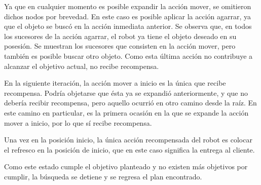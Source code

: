 \documentclass[11pt]{article}
\begin{document}
Ya que en cualquier momento es posible expandir la acción mover, se omitieron dichos nodos por brevedad. En este caso es posible aplicar la acción agarrar, ya que el objeto se buscó en la acción inmediata anterior. Se observa que, en todos los sucesores de la acción agarrar, el robot ya tiene el objeto deseado en su posesión. Se muestran los sucesores que consisten en la acción mover, pero también es posible buscar otro objeto. Como esta última acción no contribuye a alcanzar el objetivo actual, no recibe recompensa.

En la siguiente iteración, la acción mover a inicio es la única que recibe recompensa. Podría objetarse que ésta ya se expandió anteriormente, y que no debería recibir recompensa, pero aquello ocurrió en otro camino desde la raíz. En este camino en particular, es la primera ocasión en la que se expande la acción mover a inicio, por lo que sí recibe recompensa.

Una vez en la posición inicio, la única acción recompensada del robot es colocar el refresco en la posición de inicio, que en este caso significa la entrega al cliente.

Como este estado cumple el objetivo planteado y no existen más objetivos por cumplir, la búsqueda se detiene y se regresa el plan encontrado.
\end{document}
